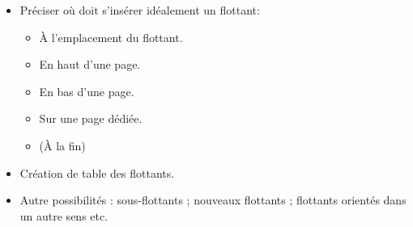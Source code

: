 \begin{slide}
  \inputminted{latex}{examples/flottant.tex}
\end{slide}

\begin{slide}
  \begin{itemize}
    \item Préciser où doit s'insérer idéalement un flottant:
      \begin{itemize}
	\item À l'emplacement du flottant.
	\item En haut d'une page.
	\item En bas d'une page.
	\item Sur une page dédiée.
	\item (À la fin)
      \end{itemize}
    \item Création de table des flottants.
    \item Autre possibilités : sous-flottants ; nouveaux flottants ; flottants orientés dans un autre sens etc.
  \end{itemize}
\end{slide}
